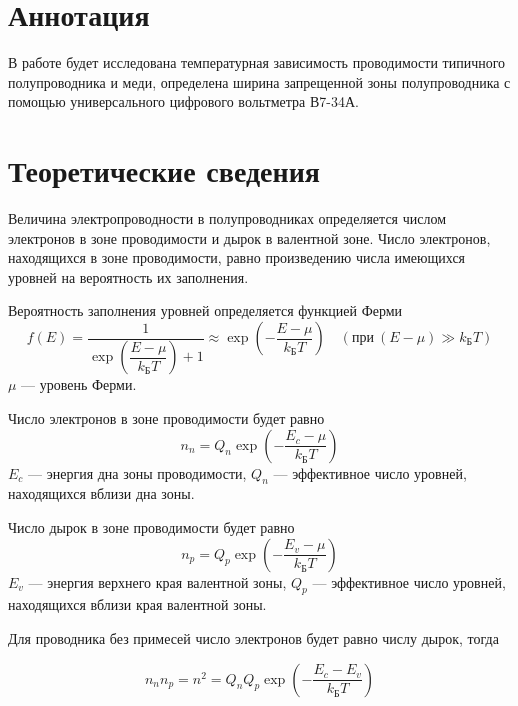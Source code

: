 \documentclass[a4paper, 12pt]{article}
\begin{document}

\section{Аннотация}
В работе будет исследована температурная зависимость проводимости
типичного полупроводника и меди, определена ширина
запрещенной зоны полупроводника с помощью универсального цифрового
вольтметра В7-34А.






\section{Теоретические сведения}

Величина электропроводности в полупроводниках определяется числом
электронов в зоне проводимости и дырок в валентной зоне. Число электронов, находящихся в зоне проводимости, равно произведению
числа имеющихся уровней на вероятность их заполнения. 

Вероятность заполнения уровней определяется функцией Ферми
\begin{equation}
    f(E) = \frac{1}{\exp \left(\dfrac{E-\mu}{k_{Б}T}\right)+1} \approx
    \exp \left(- \frac{E-\mu}{k_{Б}T}\right)\hspace{1em} \left( при\: (E-\mu)\gg
    k_{Б}T \right)
    \label{eq:1}
\end{equation}
$\mu$ --- уровень Ферми. 

Число электронов в зоне проводимости будет равно 
\begin{equation}
    n_{n} = Q_{n} \exp \left( -\frac{E_{c}-\mu}{k_{Б}T}\right)
    \label{eq:2}
\end{equation}
$E_{c}$ --- энергия дна зоны проводимости, $Q_{n}$ --- эффективное
число уровней, находящихся вблизи дна зоны.

Число дырок в зоне проводимости будет равно 
\begin{equation}
    n_{p} = Q_{p} \exp \left( -\frac{E_{v}-\mu}{k_{Б}T}\right)
    \label{eq:2}
\end{equation}
$E_{v}$ --- энергия верхнего края валентной зоны, $Q_{p}$ --- эффективное
число уровней, находящихся вблизи края валентной зоны.

Для проводника без примесей число электронов будет равно числу дырок,
тогда

\begin{equation}
    n_{n}n_{p} = n^2 = Q_{n}Q_{p} \exp \left(-
    \frac{E_{c}-E_{v}}{k_{Б}T}\right)
    \label{eq:3}
\end{equation}
\end{document}
